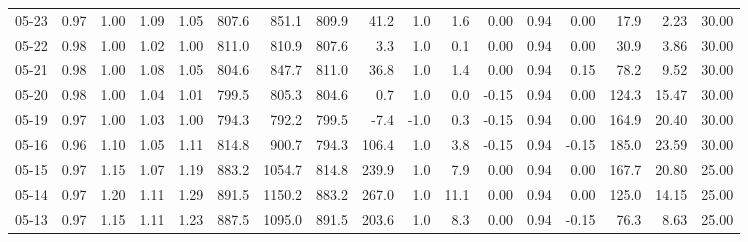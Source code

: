 \begin{threeparttable}
{\begin{tabular}{lrrrrrrrrrrrrrrrr}
  05-23 &         0.97 &           1.00 &          1.09 &          1.05 & 807.6 &  851.1 & 809.9 &       41.2 &                      1.0 &                 1.6 &       0.00 &      0.94 &           0.00 &             17.9 &            2.23 &                  30.00 \\
  05-22 &         0.98 &           1.00 &          1.02 &          1.00 & 811.0 &  810.9 & 807.6 &        3.3 &                      1.0 &                 0.1 &       0.00 &      0.94 &           0.00 &             30.9 &            3.86 &                  30.00 \\
  05-21 &         0.98 &           1.00 &          1.08 &          1.05 & 804.6 &  847.7 & 811.0 &       36.8 &                      1.0 &                 1.4 &       0.00 &      0.94 &           0.15 &             78.2 &            9.52 &                  30.00 \\
  05-20 &         0.98 &           1.00 &          1.04 &          1.01 & 799.5 &  805.3 & 804.6 &        0.7 &                      1.0 &                 0.0 &      -0.15 &      0.94 &           0.00 &            124.3 &           15.47 &                  30.00 \\
  05-19 &         0.97 &           1.00 &          1.03 &          1.00 & 794.3 &  792.2 & 799.5 &       -7.4 &                     -1.0 &                 0.3 &      -0.15 &      0.94 &           0.00 &            164.9 &           20.40 &                  30.00 \\
  05-16 &         0.96 &           1.10 &          1.05 &          1.11 & 814.8 &  900.7 & 794.3 &      106.4 &                      1.0 &                 3.8 &      -0.15 &      0.94 &          -0.15 &            185.0 &           23.59 &                  30.00 \\
  05-15 &         0.97 &           1.15 &          1.07 &          1.19 & 883.2 & 1054.7 & 814.8 &      239.9 &                      1.0 &                 7.9 &       0.00 &      0.94 &           0.00 &            167.7 &           20.80 &                  25.00 \\
  05-14 &         0.97 &           1.20 &          1.11 &          1.29 & 891.5 & 1150.2 & 883.2 &      267.0 &                      1.0 &                11.1 &       0.00 &      0.94 &           0.00 &            125.0 &           14.15 &                  25.00 \\
  05-13 &         0.97 &           1.15 &          1.11 &          1.23 & 887.5 & 1095.0 & 891.5 &      203.6 &                      1.0 &                 8.3 &       0.00 &      0.94 &          -0.15 &             76.3 &            8.63 &                  25.00 \\

\end{tabular}}
\end{threeparttable}
